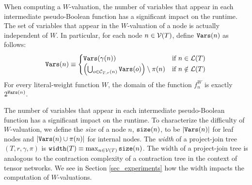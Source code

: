 When computing a $W$-valuation, the number of variables that appear in each intermediate pseudo-Boolean function has a significant impact on the runtime.
The set of variables that appear in the $W$-valuation of a node is actually independent of $W$.
In particular, for each node $n \in \mathcal{V}(T)$, define $\texttt{\upshape Vars}(n)$ as follows:
\begin{equation}
    \texttt{\upshape Vars}(n) \equiv
    \begin{cases}
        \texttt{\upshape Vars}(\gamma(n)) & \text{if}~n \in \mathcal{L}(T) \\
        \left( \bigcup_{o \in \mathcal{C}_{T,r}(n)} \texttt{\upshape Vars}(o) \right) \setminus \pi(n) & \text{if}~n \notin \mathcal{L}(T)
    \end{cases}
\end{equation}
For every literal-weight function $W$, the domain of the function $f^W_n$ is exactly $2^{\texttt{\upshape Vars}(n)}$.

The number of variables that appear in each intermediate pseudo-Boolean function has a significant impact on the runtime.
To characterize the difficulty of $W$-valuation, we define the \emph{size} of a node $n$, $\texttt{\upshape size}(n)$, to be $\left| \texttt{\upshape Vars}(n) \right|$ for leaf nodes and $\left| \texttt{\upshape Vars}(n) \cup \pi(n) \right|$ for internal nodes.
The \emph{width} of a project-join tree $(T, r, \gamma, \pi)$ is $\texttt{\upshape width}(T) \equiv \max_{n \in \mathcal{V}(T)} \texttt{\upshape size}(n)$.
The width of a project-join tree is analogous to the contraction complexity of a contraction tree in the context of tensor networks.
We see in Section \ref{sec_experiments} how the width impacts the computation of $W$-valuations.





